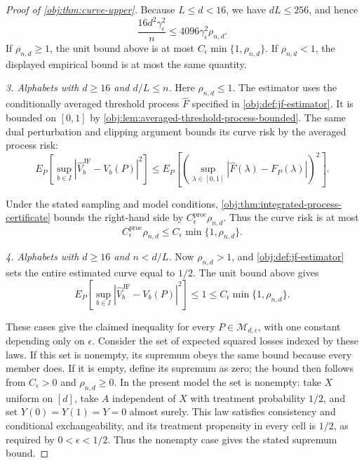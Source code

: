 \begin{proof}[Proof of \cref{obj:thm:curve-upper}]
Because \(L\le d<16\), we have \(dL\le256\), and hence
\[
\frac{16d^2\gamma_\epsilon^2}{n}
\le4096\gamma_\epsilon^2\rho_{n,d}.
\]
If \(\rho_{n,d}\ge1\), the unit bound above is at most \(C_\epsilon\min\{1,\rho_{n,d}\}\). If \(\rho_{n,d}<1\), the displayed empirical bound is at most the same quantity.

\textit{3. Alphabets with \(d\ge16\) and \(d/L\le n\).} Here \(\rho_{n,d}\le1\). The estimator uses the conditionally averaged threshold process \(\widehat F\) specified in \cref{obj:def:jf-estimator}. It is bounded on \([0,1]\) by \cref{obj:lem:averaged-threshold-process-bounded}. The same dual perturbation and clipping argument bounds its curve risk by the averaged process risk:
\[
E_P\!\left[\sup_{b\in I}
 |\widehat V_b^{\mathrm{JF}}-V_b(P)|^2\right]
\le
E_P\!\left[
 \left(\sup_{\lambda\in[0,1]}
 |\widehat F(\lambda)-F_P(\lambda)|\right)^2\right].
\]

Under the stated sampling and model conditions, \cref{obj:thm:integrated-process-certificate} bounds the right-hand side by \(C_\epsilon^{\mathrm{proc}}\rho_{n,d}\). Thus the curve risk is at most
\[
C_\epsilon^{\mathrm{proc}}\rho_{n,d}
\le C_\epsilon\min\{1,\rho_{n,d}\}.
\]

\textit{4. Alphabets with \(d\ge16\) and \(n<d/L\).} Now \(\rho_{n,d}>1\), and \cref{obj:def:jf-estimator} sets the entire estimated curve equal to \(1/2\). The unit bound above gives
\[
E_P\!\left[\sup_{b\in I}
 |\widehat V_b^{\mathrm{JF}}-V_b(P)|^2\right]
\le1\le C_\epsilon\min\{1,\rho_{n,d}\}.
\]

These cases give the claimed inequality for every \(P\in\mathcal M_{d,\epsilon}\), with one constant depending only on \(\epsilon\). Consider the set of expected squared losses indexed by these laws. If this set is nonempty, its supremum obeys the same bound because every member does. If it is empty, define its supremum as zero; the bound then follows from \(C_\epsilon>0\) and \(\rho_{n,d}\ge0\). In the present model the set is nonempty: take \(X\) uniform on \([d]\), take \(A\) independent of \(X\) with treatment probability \(1/2\), and set \(Y(0)=Y(1)=Y=0\) almost surely. This law satisfies consistency and conditional exchangeability, and its treatment propensity in every cell is \(1/2\), as required by \(0<\epsilon<1/2\). Thus the nonempty case gives the stated supremum bound.
\end{proof}

